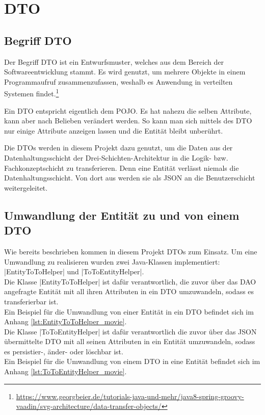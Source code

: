 \section{\acf{DTO}}
\label{sec:dto}
\authorsection{\authorSG}

\subsection{Begriff \acf{DTO}}
\label{ssec:Was_ist_dto}
\authorsection{\authorSG}

Der Begriff \ac{DTO} ist ein Entwurfsmuster, welches aus dem Bereich der Softwareentwicklung stammt.
Es wird genutzt, um mehrere Objekte in einem Programmaufruf zusammenzufassen, weshalb es Anwendung in verteilten Systemen findet.\footnote{\url{https://www.georgbeier.de/tutorials-java-und-mehr/java8-spring-groovy-vaadin/svg-architecture/data-transfer-objects/}}

Ein \ac{DTO} entspricht eigentlich dem \ac{POJO}.
Es hat nahezu die selben Attribute, kann aber nach Belieben verändert werden.
So kann man sich mittels des \ac{DTO} nur einige Attribute anzeigen lassen und die Entität bleibt unberührt.

Die \acsp{DTO} werden in diesem Projekt dazu genutzt, um die Daten aus der Datenhaltungsschicht der Drei-Schichten-Architektur in die Logik- bzw. Fachkonzeptschicht zu transferieren. Denn eine Entität verlässt niemals die Datenhaltungsschicht.
Von dort aus werden sie als \acs{JSON} an die Benutzerschicht weitergeleitet.

\subsection{Umwandlung der Entität zu und von einem \acf{DTO}}
\label{ssec:umwandlung_dto}
\authorsection{\authorSG}

Wie bereits beschrieben kommen in diesem Projekt \acp{DTO} zum Einsatz. Um eine Umwandlung zu realisieren wurden zwei Java-Klassen implementiert: \jinline|EntityToToHelper| und \jinline|ToToEntityHelper|. \\

Die Klasse \jinline|EntityToToHelper| ist dafür verantwortlich, die zuvor über das \acs{DAO} angefragte Entität mit all ihren Attributen in ein \acs{DTO} umzuwandeln, sodass es transferierbar ist. \\
Ein Beispiel für die Umwandlung von einer Entität in ein \acs{DTO} befindet sich im Anhang \vref{lst:EntityToToHelper_movie}. \\

Die Klasse \jinline|ToToEntityHelper| ist dafür verantwortlich die zuvor über das \acs{JSON} übermittelte \acs{DTO} mit all seinen Attributen in ein Entität umzuwandeln, sodass es persistier-, änder- oder löschbar ist.\\ 
Ein Beispiel für die Umwandlung von einem \acs{DTO} in eine Entität befindet sich im Anhang \vref{lst:ToToEntityHelper_movie}.
